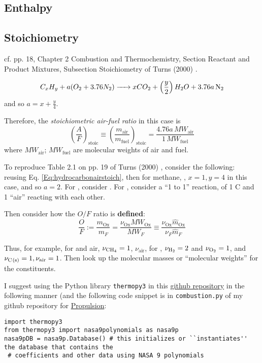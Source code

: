 \documentclass[10pt]{amsart}
\begin{document}
\begin{multicols*}{2}
\section{Enthalpy}
\subsection{Stoichiometry}

cf. pp. 18, Chapter 2 Combustion and Thermochemistry, Section Reactant and Product Mixtures, Subsection Stoichiometry of Turns (2000) \cite{STurns2011}.  

\begin{equation}\label{Eq:hydrocarbonairstoich}
C_xH_y + a (O_2 + 3.76  N_2 ) \ce{->} x CO_2 + \left( \frac{y}{2} \right) H_2O + 3.76 \ce{ a N_2 }
\end{equation}
and so $a = x+\frac{y}{4}$.  

Therefore, the \emph{stoichiometric air-fuel ratio} in this case is 
\[
\left( \frac{A}{F} \right)_{\text{stoic}} \equiv \left( \frac{m_{\text{air}} }{ m_{\text{fuel} } } \right)_{\text{stoic} } = \frac{4.76 a \, MW_{\text{air}} }{ 1 \, MW_{\text{fuel}} }
\]
where $MW_{\text{air}}$; $MW_{\text{fuel}}$ are molecular weights of air and fuel.  

To reproduce Table 2.1 on pp. 19 of Turns (2000) \cite{STurns2011}, consider the following: \\
reusing Eq. \ref{Eq:hydrocarbonairstoich}, then for methane, , $x=1,y=4$ in this case, and so $a = 2$.  For , consider .  For , consider a ``1 to 1'' reaction, of 1 C and 1 ``air'' reacting with each other.  

Then consider how the $O/F$ ratio is \textbf{defined}:
\begin{equation}
  \frac{O}{F} := \frac{m_{\text{Ox} } }{ m_F } = \frac{ \nu_{\text{Ox} } MW_{\text{Ox}} }{ MW_F } \equiv \frac{ \nu_{\text{Ox}} \widehat{m}_{\text{Ox}} }{ \nu_F \widehat{m}_F } 
\end{equation}

Thus, for example, for  and air, $\nu_{\ce{CH_4}}=1$, $\nu_{\text{air}}$, for , $\nu_{\ce{H_2}}=2$ and $\nu_{\ce{O_2}}=1$, and $\nu_{\ce{C(s)}} = 1, \nu_{\text{air}}=1$.  Then look up the molecular masses or ``molecular weights'' for the constituents.  

I suggest using the Python library \verb|thermopy3| in this \href{https://github.com/fmv1992/thermopy3.git}{github repository} in the following manner (and the following  code snippet is in \verb|combustion.py| of my github repository for \href{https://github.com/ernestyalumni/Propulsion.git}{Propulsion}:
\begin{lstlisting}
import thermopy3
from thermopy3 import nasa9polynomials as nasa9p
nasa9pDB = nasa9p.Database() # this initializes or ``instantiates'' the database that contains the 
 # coefficients and other data using NASA 9 polynomials


\end{lstlisting}
\end{multicols*}
\end{document}
